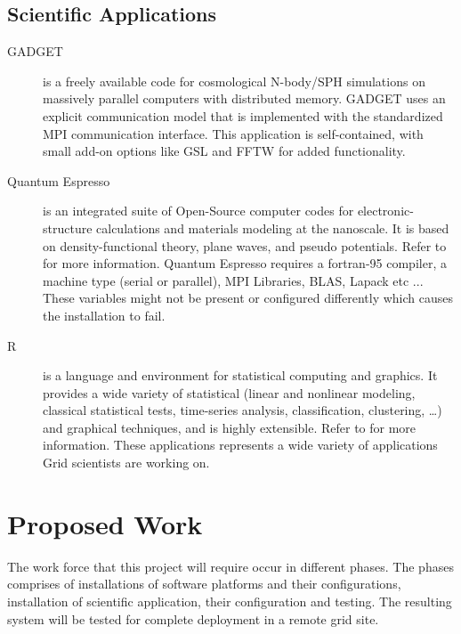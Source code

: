 \documentclass [titlepage,11pt]{article}
\begin{document}
\subsection{Scientific Applications}

\begin{description}
\item[GADGET] is a freely available code for cosmological N-body/SPH simulations on massively parallel computers with distributed memory. GADGET uses an explicit communication model that is implemented with the standardized MPI communication interface. This application is self-contained, with small add-on options like GSL and FFTW for added functionality. 

\item[Quantum Espresso] is an integrated suite of Open-Source computer codes for electronic-structure calculations and materials modeling at the nanoscale. It is based on density-functional theory, plane waves, and pseudo potentials. Refer to \citep{Qespresso} for more information. Quantum Espresso requires a fortran-95 compiler, a machine type (serial or parallel), MPI Libraries, BLAS, Lapack etc ... These variables might not be present or configured differently which causes the installation to fail.  

\item[R] is a language and environment for statistical computing and graphics. It provides a wide variety of statistical (linear and nonlinear modeling, classical statistical tests, time-series analysis, classification, clustering, …) and graphical techniques, and is highly extensible. Refer to \citep{R} for more information. These applications represents a wide variety of applications Grid scientists are working on.
\end{description} 

\section{Proposed Work}
The work force that this project will require occur in different phases. The phases comprises of installations of software platforms and their configurations, installation of scientific application, their configuration and testing. The resulting system will be tested for complete deployment in a remote grid site. \\
\end{document}

